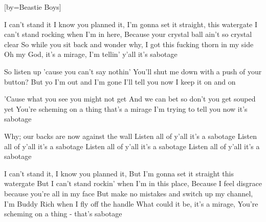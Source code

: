 

[by=Beastie Boys]


\beginverse
I can't stand it I know you planned it, I'm gonna set it straight, this watergate
I can't stand rocking when I'm in here, Because your crystal ball ain't so crystal clear
So while you sit back and wonder why, I got this fucking thorn in my side
Oh my God, it's a mirage, I'm tellin' y'all it's sabotage
\endverse

\beginverse
So listen up 'cause you can't say nothin'
You'll shut me down with a push of your button?
But yo I'm out and I'm gone
I'll tell you now I keep it on and on
\endverse

\beginverse
'Cause what you see you might not get
And we can bet so don't you get souped yet
You're scheming on a thing that's a mirage
I'm trying to tell you now it's sabotage
\endverse

\beginverse
Why; our backs are now against the wall
Listen all of y'all it's a sabotage
Listen all of y'all it's a sabotage
Listen all of y'all it's a sabotage
Listen all of y'all it's a sabotage
\endverse

\beginverse
I can't stand it, I know you planned it, But I'm gonna set it straight this watergate
But I can't stand rockin' when I'm in this place, Because I feel disgrace because you're all in my face
But make no mistakes and switch up my channel, I'm Buddy Rich when I fly off the handle
What could it be, it's a mirage, You're scheming on a thing - that's sabotage
\endverse

\endsong
